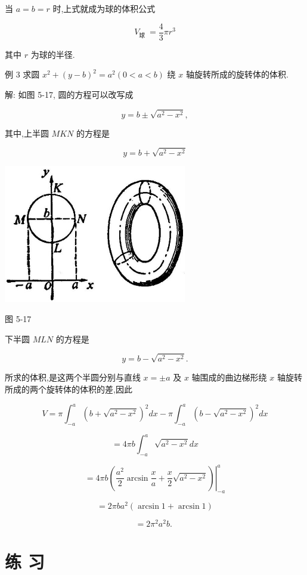 \documentclass[10pt]{article}
\begin{document}
当 \(a = b = r\) 时,上式就成为球的体积公式

\[
{V}_{\text{球 }} = \frac{4}{3}\pi {r}^{3}
\]

其中 \(r\) 为球的半径.

例 3 求圆 \({x}^{2} + {\left( y - b\right) }^{2} = {a}^{2}\left( {0 < a < b}\right)\) 绕 \(x\) 轴旋转所成的旋转体的体积.

解: 如图 5-17, 圆的方程可以改写成

\[
y = b \pm \sqrt{{a}^{2} - {x}^{2}},
\]

其中,上半圆 \({MKN}\) 的方程是

\[
y = b + \sqrt{{a}^{2} - {x}^{2}}
\]

\begin{center}
\includegraphics[max width=0.6\textwidth]{images/01912c18-5c3f-733d-b775-749ba9897a9d_239_464014.jpg}
\end{center}

图 5-17

下半圆 \({MLN}\) 的方程是

\[
y = b - \sqrt{{a}^{2} - {x}^{2}}.
\]

所求的体积,是这两个半圆分别与直线 \(x = \pm a\) 及 \(x\) 轴围成的曲边梯形绕 \(x\) 轴旋转所成的两个旋转体的体积的差,因此

\[
V = \pi {\int }_{-a}^{a}{\left( b + \sqrt{{a}^{2} - {x}^{2}}\right) }^{2}{dx} - \pi {\int }_{-a}^{a}{\left( b - \sqrt{{a}^{2} - {x}^{2}}\right) }^{2}{dx}
\]

\[
= {4\pi b}{\int }_{-a}^{a}\sqrt{{a}^{2} - {x}^{2}}{dx}
\]

\[
= {\left. 4\pi b\left( \frac{{a}^{2}}{2}\arcsin \frac{x}{a} + \frac{x}{2}\sqrt{{a}^{2} - {x}^{2}}\right) \right| }_{-a}^{a}
\]

\[
= {2\pi b}{a}^{2}\left( {\arcsin 1 + \arcsin 1}\right)
\]

\[
= 2{\pi }^{2}{a}^{2}b\text{. }
\]

\section*{练 习}
\end{document}
